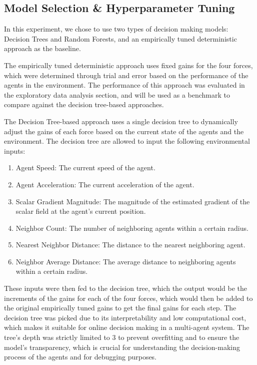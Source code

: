 \documentclass[11pt]{article}
\begin{document}
\subsection{Model Selection \& Hyperparameter Tuning}

In this experiment, we chose to use two types of decision making models: Decision Trees and Random Forests, and an empirically tuned deterministic approach as the baseline.

The empirically tuned deterministic approach uses fixed gains for the four forces, which were determined through trial and error based on the performance of the agents in the environment.
The performance of this approach was evaluated in the exploratory data analysis section, and will be used as a benchmark to compare against the decision tree-based approaches.

The Decision Tree-based approach uses a single decision tree to dynamically adjust the gains of each force based on the current state of the agents and the environment.
The decision tree are allowed to input the following environmental inputs:
\begin{enumerate}
    \item Agent Speed: The current speed of the agent.
    \item Agent Acceleration: The current acceleration of the agent.
    \item Scalar Gradient Magnitude: The magnitude of the estimated gradient of the scalar field at the agent's current position.
    \item Neighbor Count: The number of neighboring agents within a certain radius.
    \item Nearest Neighbor Distance: The distance to the nearest neighboring agent.
    \item Neighbor Average Distance: The average distance to neighboring agents within a certain radius.
\end{enumerate}

These inputs were then fed to the decision tree, which the output would be the increments of the gains for each of the four forces, which would then be added to the original empirically tuned gains to get the final gains for each step.
The decision tree was picked due to its interpretability and low computational cost, which makes it suitable for online decision making in a multi-agent system.
The tree's depth was strictly limited to 3 to prevent overfitting and to ensure the model's transparency, which is crucial for understanding the decision-making process of the agents and for debugging purposes.
\end{document}
